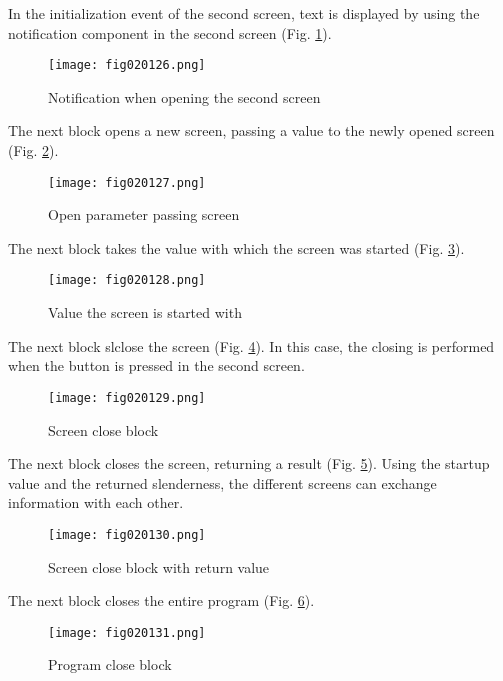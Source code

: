 In the initialization event of the second screen, text is displayed by using the notification component in the second screen (Fig. \ref{fig020126}).

\begin{figure}[H]
   \centering
   \texttt{[image: fig020126.png]}
   \caption{Notification when opening the second screen}
\label{fig020126}
\end{figure}

The next block opens a new screen, passing a value to the newly opened screen (Fig. \ref{fig020127}).

\begin{figure}[H]
   \centering
   \texttt{[image: fig020127.png]}
   \caption{Open parameter passing screen}
\label{fig020127}
\end{figure}

The next block takes the value with which the screen was started (Fig. \ref{fig020128}).

\begin{figure}[H]
   \centering
   \texttt{[image: fig020128.png]}
   \caption{Value the screen is started with}
\label{fig020128}
\end{figure}

The next block slclose the screen (Fig. \ref{fig020129}). In this case, the closing is performed when the button is pressed in the second screen.

\begin{figure}[H]
   \centering
   \texttt{[image: fig020129.png]}
   \caption{Screen close block}
\label{fig020129}
\end{figure}

The next block closes the screen, returning a result (Fig. \ref{fig020130}). Using the startup value and the returned slenderness, the different screens can exchange information with each other.

\begin{figure}[H]
   \centering
   \texttt{[image: fig020130.png]}
   \caption{Screen close block with return value}
\label{fig020130}
\end{figure}

The next block closes the entire program (Fig. \ref{fig020131}).

\begin{figure}[H]
   \centering
   \texttt{[image: fig020131.png]}
   \caption{Program close block}
\label{fig020131}
\end{figure}

